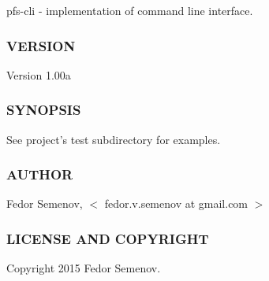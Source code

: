 {\ttfamily pfs-\/cli} -\/ implementation of command line interface.

\subsubsection*{V\-E\-R\-S\-I\-O\-N}

Version 1.\-00a

\subsubsection*{S\-Y\-N\-O\-P\-S\-I\-S}

See project's test subdirectory for examples.

\subsubsection*{A\-U\-T\-H\-O\-R}

Fedor Semenov, $<$ fedor.\-v.\-semenov at gmail.\-com $>$

\subsubsection*{L\-I\-C\-E\-N\-S\-E A\-N\-D C\-O\-P\-Y\-R\-I\-G\-H\-T}

Copyright 2015 Fedor Semenov. 